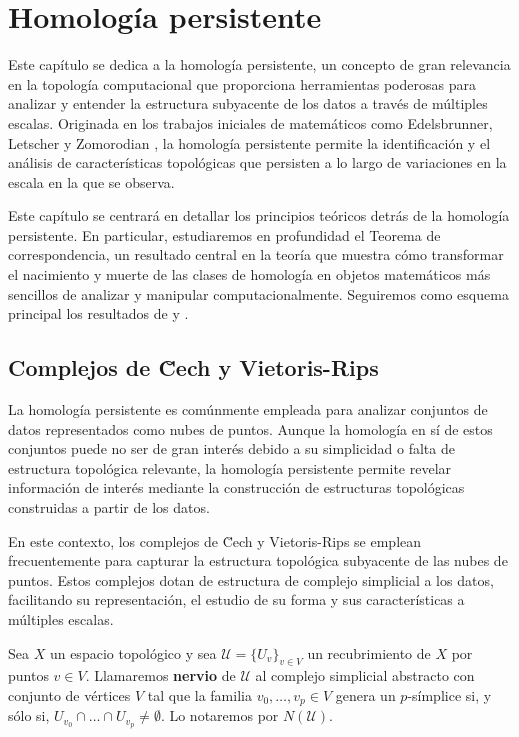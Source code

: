 
\chapter{Homología persistente}
\label{chapter:persistent-homology}

Este capítulo se dedica a la homología persistente, un concepto de gran
relevancia en la topología computacional que proporciona herramientas poderosas
para analizar y entender la estructura subyacente de los datos a través de
múltiples escalas. Originada en los trabajos iniciales de matemáticos como Edelsbrunner,
Letscher y Zomorodian \cite{edelsbrunner2002topological}, la homología persistente
permite la identificación y el análisis de características topológicas que persisten
a lo largo de variaciones en la escala en la que se observa.

Este capítulo se centrará en detallar los principios teóricos detrás de la homología
persistente. En particular, estudiaremos en profundidad el Teorema de correspondencia,
un resultado central en la teoría que muestra cómo transformar el nacimiento y
muerte de las clases de homología en objetos matemáticos más sencillos de
analizar y manipular computacionalmente. Seguiremos como esquema principal los resultados
de \cite{zomorodian2004computing} y \cite{dey2022computational}.

\section{Complejos de \u Cech y Vietoris-Rips}

La homología persistente es comúnmente empleada para analizar conjuntos de datos
representados como nubes de puntos. Aunque la homología en sí de estos conjuntos
puede no ser de gran interés debido a su simplicidad o falta de estructura topológica
relevante, la homología persistente permite revelar información de interés
mediante la construcción de estructuras topológicas construidas a partir de los
datos.

En este contexto, los complejos de \u Cech y Vietoris-Rips se emplean frecuentemente
para capturar la estructura topológica subyacente de las nubes de puntos. Estos
complejos dotan de estructura de complejo simplicial a los datos, facilitando su
representación, el estudio de su forma y sus características a múltiples escalas.

\begin{definicion}
	Sea $X$ un espacio topológico y sea $\mathcal{U}= \{U_{v}\}_{v \in V}$ un recubrimiento
	de $X$ por puntos $v \in V$. Llamaremos \textbf{nervio} de $\mathcal{U}$ al complejo
	simplicial abstracto con conjunto de vértices $V$ tal que la familia $v_{0}, \dots
	, v_{p} \in V$ genera un $p$-símplice si, y sólo si, $U_{v_0}\cap \dots \cap U_{v_p}
	\neq \emptyset$. Lo notaremos por $N(\mathcal{U})$.
\end{definicion}

